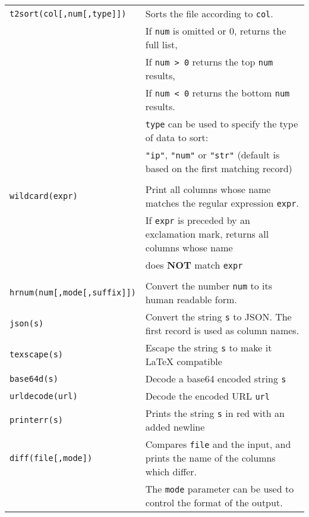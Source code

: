 \documentclass[documentation]{subfiles}
\begin{document}
\begin{longtable}{ll}
    {\tt t2sort(col[,num[,type]])} & Sorts the file according to {\tt col}.\\
                             & If {\tt num} is omitted or 0, returns the full list,\\
                             & If {\tt num > 0} returns the top {\tt num} results,\\
                             & If {\tt num < 0} returns the bottom {\tt num} results.\\
                             & {\tt type} can be used to specify the type of data to sort:\\
                             & {\tt "ip"}, {\tt "num"} or {\tt "str"} (default is based on the first matching record)\\\\

    {\tt wildcard(expr)}     & Print all columns whose name matches the regular expression {\tt expr}.\\
                             & If {\tt expr} is preceded by an exclamation mark, returns all columns whose name\\
                             & does {\bf NOT} match {\tt expr}\\\\

    {\tt hrnum(num[,mode[,suffix]])} & Convert the number {\tt num} to its human readable form.\\

    {\tt json(s)}           & Convert the string {\tt s} to JSON. The first record is used as column names.\\
    {\tt texscape(s)}       & Escape the string {\tt s} to make it LaTeX compatible\\
    {\tt base64d(s)}        & Decode a base64 encoded string {\tt s}\\
    {\tt urldecode(url)}    & Decode the encoded URL {\tt url}\\
    {\tt printerr(s)}       & Prints the string {\tt s} in red with an added newline\\
    {\tt diff(file[,mode])} & Compares {\tt file} and the input, and prints the name of the columns which differ.\\
                            & The {\tt mode} parameter can be used to control the format of the output.\\


\end{longtable}
\end{document}
